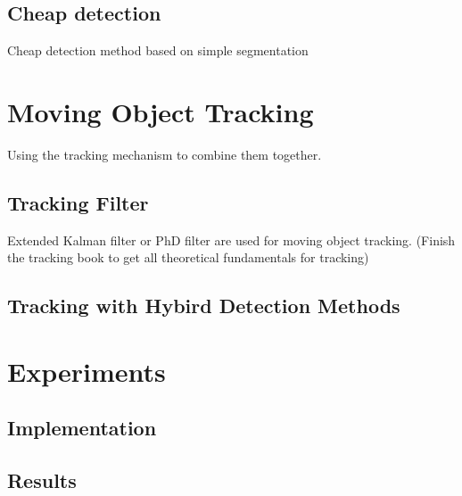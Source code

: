 \documentclass[12pt]{article}
\begin{document}
\subsection{Cheap detection}
Cheap detection method based on simple segmentation

\section{Moving Object Tracking}

Using the tracking mechanism to combine them together.

\subsection{Tracking Filter}
Extended Kalman filter or PhD filter are used for moving object tracking. (Finish the tracking book to get all theoretical fundamentals for tracking)
\subsection{Tracking with Hybird Detection Methods}




\section{Experiments}\label{experiments}
\subsection{Implementation}\label{Implementation} 


\subsection{Results}
 
 



\end{document}
